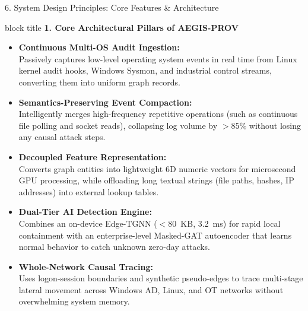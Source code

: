 \documentclass[aspectratio=169,10pt]{beamer}
\begin{document}
\begin{frame}{6. System Design Principles: Core Features \& Architecture}
\vspace{0.2em}
\begin{beamercolorbox}[rounded=true,shadow=false,sep=0.38em,wd=\textwidth]{block title}
\textbf{\scriptsize 1. Core Architectural Pillars of AEGIS-PROV}
\end{beamercolorbox}
\vspace{0.15em}
{\fontsize{7.6pt}{10.8pt}\selectfont
\begin{itemize}\itemsep0.28em
  \item \textbf{Continuous Multi-OS Audit Ingestion:}\\
  Passively captures low-level operating system events in real time from Linux kernel audit hooks, Windows Sysmon, and industrial control streams, converting them into uniform graph records.
  \item \textbf{Semantics-Preserving Event Compaction:}\\
  Intelligently merges high-frequency repetitive operations (such as continuous file polling and socket reads), collapsing log volume by \textbf{$>85\%$} without losing any causal attack steps.
  \item \textbf{Decoupled Feature Representation:}\\
  Converts graph entities into lightweight 6D numeric vectors for microsecond GPU processing, while offloading long textual strings (file paths, hashes, IP addresses) into external lookup tables.
  \item \textbf{Dual-Tier AI Detection Engine:}\\
  Combines an on-device Edge-TGNN ($<80$~KB, 3.2~ms) for rapid local containment with an enterprise-level Masked-GAT autoencoder that learns normal behavior to catch unknown zero-day attacks.
  \item \textbf{Whole-Network Causal Tracing:}\\
  Uses logon-session boundaries and synthetic pseudo-edges to trace multi-stage lateral movement across Windows AD, Linux, and OT networks without overwhelming system memory.
\end{itemize}
}
\end{frame}
\end{document}
